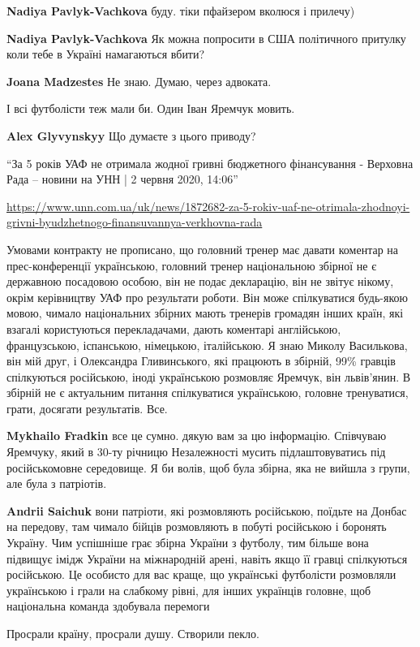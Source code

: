 \begin{itemize}
\begin{itemize}
\textbf{Nadiya Pavlyk-Vachkova} буду. тіки пфайзером вколюся і прилечу)

\textbf{Nadiya Pavlyk-Vachkova} Як можна попросити в США політичного притулку коли тебе в Україні намагаються вбити?

\textbf{Joana Madzestes} Не знаю. Думаю, через адвоката.
\end{itemize}

І всі футболісти теж мали би. Один Іван Яремчук мовить.

\textbf{Alex Glyvynskyy} Що думаєте з цього приводу?


\enquote{За 5 років УАФ не отримала жодної гривні бюджетного фінансування - Верховна
Рада – новини на УНН | 2 червня 2020, 14:06}\par
\url{https://www.unn.com.ua/uk/news/1872682-za-5-rokiv-uaf-ne-otrimala-zhodnoyi-grivni-byudzhetnogo-finansuvannya-verkhovna-rada}

Умовами контракту не
прописано, що головний тренер має давати коментар на прес-конференції
українською, головний тренер національною збірної не є державною посадовою
особою, він не подає декларацію, він не звітує нікому, окрім керівництву УАФ
про результати роботи. Він може спілкуватися будь-якою мовою, чимало
національних збірних мають тренерів громадян інших країн, які взагалі
користуються перекладачами, дають коментарі англійською, французською,
іспанською, німецькою, італійською. Я знаю Миколу Василькова, він мій друг, і
Олександра Гливинського, які працюють в збірній, 99\% гравців спілкуються
російською, іноді українською розмовляє Яремчук, він львів'янин. В збірній не є
актуальним питання спілкуватися українською, головне тренуватися, грати,
досягати результатів. Все.

\begin{itemize}

\textbf{Mykhailo Fradkin} все це сумно. дякую вам за цю інформацію. Співчуваю
Яремчуку, який в 30-ту річницю Незалежності мусить підлаштовуватись під
російськомовне середовище. Я би волів, щоб була збірна, яка не вийшла з групи,
але була з патріотів.

\textbf{Andrii Saichuk} вони патріоти, які розмовляють російською, поїдьте на
Донбас на передову, там чимало бійців розмовляють в побуті російською і
боронять Україну. Чим успішніше грає збірна України з футболу, тим більше вона
підвищує імідж України на міжнародній арені, навіть якщо її гравці спілкуються
російською. Це особисто для вас краще, що українські футболісти розмовляли
українською і грали на слабкому рівні, для інших українців головне, щоб
національна команда здобувала перемоги

\end{itemize}


Просрали країну, просрали душу. Створили пекло.

\end{itemize}

